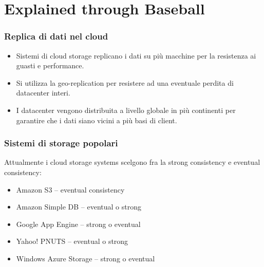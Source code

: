 \section{Explained through Baseball}

\begin{frame}
 \frametitle{Replica di dati nel cloud}
 \begin{itemize}
   \item Sistemi di cloud storage replicano i dati su più macchine per la resistenza ai guasti e performance.
   \item Si utilizza la geo-replication per resistere ad una eventuale perdita di datacenter interi.
   \item I datacenter vengono distribuita a livello globale in più continenti per garantire che i dati siano vicini a più basi di client.
 \end{itemize}
  
\end{frame}

\begin{frame}
 \frametitle{Sistemi di storage popolari}
Attualmente i cloud storage systems scelgono fra la strong consistency e eventual consistency:
 \begin{itemize}
   \item Amazon S3 – eventual consistency
   \item Amazon Simple DB – eventual o strong
   \item Google App Engine – strong o eventual
   \item Yahoo! PNUTS – eventual o strong
   \item Windows Azure Storage – strong o eventual
 \end{itemize}
\end{frame}

